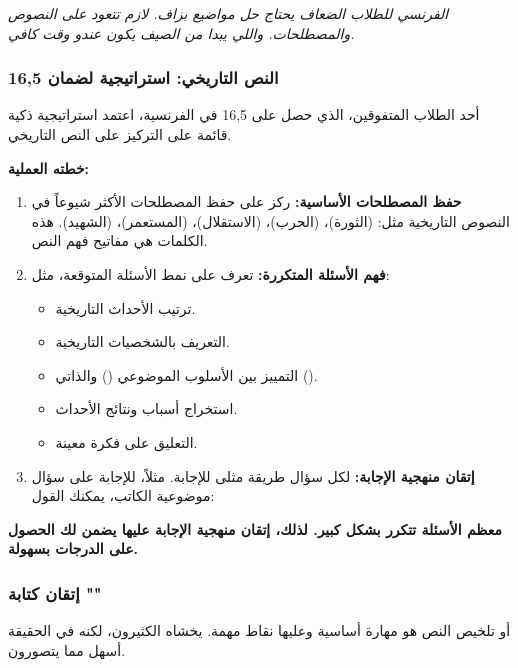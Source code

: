 \documentclass[12pt,a4paper]{book}
\newcommand{\quoteAr}[1]{%
	\begin{myquote}
		\itshape #1
	\end{myquote}
}
\newcommand{\importantAr}[1]{%
	\begin{important}
		\bfseries #1
	\end{important}
}
\begin{document}
	\quoteAr{الفرنسي للطلاب الضعاف يحتاج حل مواضيع بزاف. لازم تتعود على النصوص والمصطلحات. واللي يبدا من الصيف يكون عندو وقت كافي.}
	
	\subsubsection{النص التاريخي: استراتيجية لضمان 16,5}
	
	أحد الطلاب المتفوقين، الذي حصل على 16,5 في الفرنسية، اعتمد استراتيجية ذكية قائمة على التركيز على النص التاريخي.
	
	\textbf{خطته العملية:}
	
	\begin{enumerate}
		\item \textbf{حفظ المصطلحات الأساسية:} ركز على حفظ المصطلحات الأكثر شيوعاً في النصوص التاريخية مثل:  (الثورة)،  (الحرب)،  (الاستقلال)،  (المستعمر)،  (الشهيد). هذه الكلمات هي مفاتيح فهم النص.
		\item \textbf{فهم الأسئلة المتكررة:} تعرف على نمط الأسئلة المتوقعة، مثل:
		\begin{itemize}
			\item ترتيب الأحداث التاريخية.
			\item التعريف بالشخصيات التاريخية.
			\item التمييز بين الأسلوب الموضوعي () والذاتي ().
			\item استخراج أسباب ونتائج الأحداث.
			\item التعليق على فكرة معينة.
		\end{itemize}
		\item \textbf{إتقان منهجية الإجابة:} لكل سؤال طريقة مثلى للإجابة. مثلاً، للإجابة على سؤال موضوعية الكاتب، يمكنك القول:\newline {}
	\end{enumerate}
	
	\importantAr{معظم الأسئلة تتكرر بشكل كبير. لذلك، إتقان منهجية الإجابة عليها يضمن لك الحصول على الدرجات بسهولة.}
	
	\subsubsection{إتقان كتابة ""}
	
	 أو تلخيص النص هو مهارة أساسية وعليها نقاط مهمة. يخشاه الكثيرون، لكنه في الحقيقة أسهل مما يتصورون.
	
\end{document}
